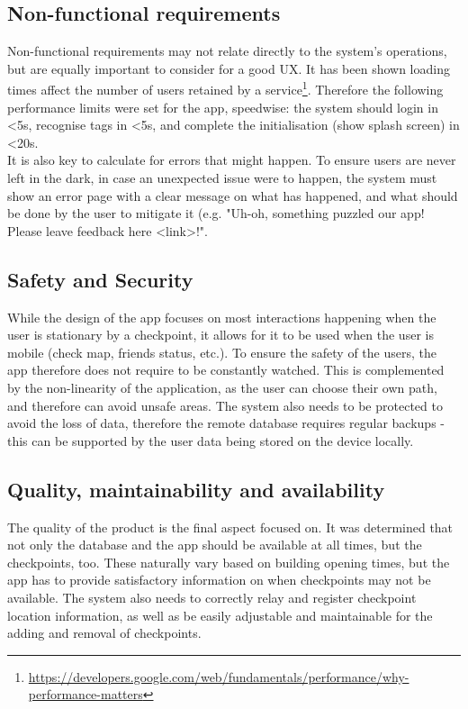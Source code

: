 \documentclass[10pt,twocolumn]{article} %
\begin{document}
\subsection*{Non-functional requirements}
Non-functional requirements may not relate directly to the system's operations, but are equally important to consider for a good UX. It has been shown loading times affect the number of users retained by a service\footnote{\url{https://developers.google.com/web/fundamentals/performance/why-performance-matters}}. Therefore the following performance limits were set for the app, speedwise: the system should login in \textless5s, recognise tags in \textless5s, and complete the initialisation (show splash screen) in \textless20s.\\
It is also key to calculate for errors that might happen. To ensure users are never left in the dark, in case an unexpected issue were to happen, the system must show an error page with a clear message on what has happened, and what should be done by the user to mitigate it (e.g. "Uh-oh, something puzzled our app! Please leave feedback here \textless link\textgreater!".
\subsection*{Safety and Security}
While the design of the app focuses on most interactions happening when the user is stationary by a checkpoint, it allows for it to be used when the user is mobile (check map, friends status, etc.). To ensure the safety of the users, the app therefore does not require to be constantly watched. This is complemented by the non-linearity of the application, as the user can choose their own path, and therefore can avoid unsafe areas. The system also needs to be protected to avoid the loss of data, therefore the remote database requires regular backups - this can be supported by the user data being stored on the device locally.
\subsection*{Quality, maintainability and availability}
The quality of the product is the final aspect focused on. It was determined that not only the database and the app should be available at all times, but the checkpoints, too. These naturally vary based on building opening times, but the app has to provide satisfactory information on when checkpoints may not be available. The system also needs to correctly relay and register checkpoint location information, as well as be easily adjustable and maintainable for the adding and removal of checkpoints. 
\end{document}
